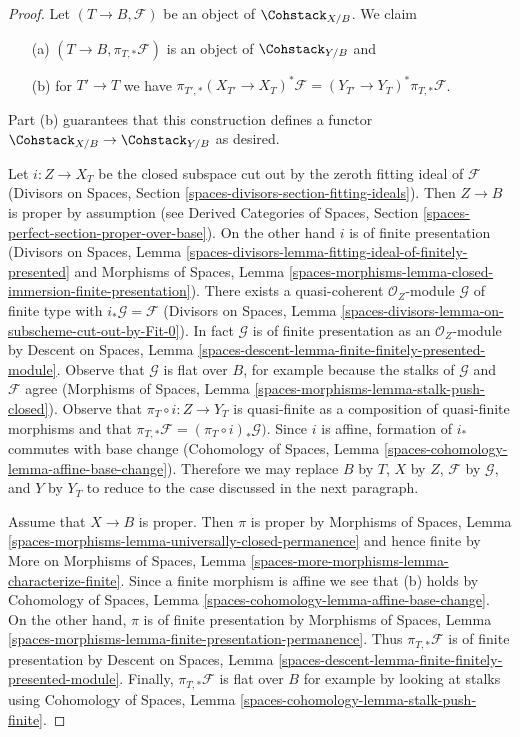 \begin{proof}
Let $(T \to B, \mathcal{F})$ be an object of $\Cohstack_{X/B}$.
We claim
\begin{enumerate}
\item[(a)] $(T \to B, \pi_{T, *}\mathcal{F})$ is an object
of $\Cohstack_{Y/B}$ and
\item[(b)] for $T' \to T$ we have
$\pi_{T', *}(X_{T'} \to X_T)^*\mathcal{F} =
(Y_{T'} \to Y_T)^*\pi_{T, *}\mathcal{F}$.
\end{enumerate}
Part (b) guarantees that this construction defines a functor
$\Cohstack_{X/B} \to \Cohstack_{Y/B}$ as desired.

\medskip\noindent
Let $i : Z \to X_T$ be the closed subspace cut out by the zeroth
fitting ideal of $\mathcal{F}$
(Divisors on Spaces, Section
\ref{spaces-divisors-section-fitting-ideals}).
Then $Z \to B$ is proper by assumption (see
Derived Categories of Spaces, Section
\ref{spaces-perfect-section-proper-over-base}).
On the other hand $i$ is of finite presentation
(Divisors on Spaces, Lemma
\ref{spaces-divisors-lemma-fitting-ideal-of-finitely-presented} and
Morphisms of Spaces, Lemma
\ref{spaces-morphisms-lemma-closed-immersion-finite-presentation}).
There exists a quasi-coherent $\mathcal{O}_Z$-module
$\mathcal{G}$ of finite type with $i_*\mathcal{G} = \mathcal{F}$
(Divisors on Spaces, Lemma
\ref{spaces-divisors-lemma-on-subscheme-cut-out-by-Fit-0}).
In fact $\mathcal{G}$ is of finite presentation as an $\mathcal{O}_Z$-module
by Descent on Spaces, Lemma
\ref{spaces-descent-lemma-finite-finitely-presented-module}.
Observe that $\mathcal{G}$ is flat over $B$, for example
because the stalks of $\mathcal{G}$ and $\mathcal{F}$ agree
(Morphisms of Spaces, Lemma \ref{spaces-morphisms-lemma-stalk-push-closed}).
Observe that $\pi_T \circ i : Z \to Y_T$ is quasi-finite as a composition
of quasi-finite morphisms and that
$\pi_{T, *}\mathcal{F} = (\pi_T \circ i)_*\mathcal{G})$.
Since $i$ is affine, formation of $i_*$ commutes with base change
(Cohomology of Spaces, Lemma \ref{spaces-cohomology-lemma-affine-base-change}).
Therefore we may replace $B$ by $T$, $X$ by $Z$,
$\mathcal{F}$ by $\mathcal{G}$, and $Y$ by $Y_T$
to reduce to the case discussed in the next paragraph.

\medskip\noindent
Assume that $X \to B$ is proper. Then $\pi$ is proper
by Morphisms of Spaces, Lemma
\ref{spaces-morphisms-lemma-universally-closed-permanence}
and hence finite by
More on Morphisms of Spaces,
Lemma \ref{spaces-more-morphisms-lemma-characterize-finite}.
Since a finite morphism is affine we see that (b) holds by
Cohomology of Spaces, Lemma \ref{spaces-cohomology-lemma-affine-base-change}.
On the other hand, $\pi$ is of finite presentation by
Morphisms of Spaces, Lemma
\ref{spaces-morphisms-lemma-finite-presentation-permanence}.
Thus $\pi_{T, *}\mathcal{F}$ is of finite presentation by
Descent on Spaces, Lemma
\ref{spaces-descent-lemma-finite-finitely-presented-module}.
Finally, $\pi_{T, *}\mathcal{F} $ is flat over $B$ for example
by looking at stalks using
Cohomology of Spaces, Lemma \ref{spaces-cohomology-lemma-stalk-push-finite}.
\end{proof}

